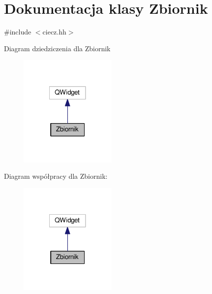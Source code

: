 \hypertarget{class_zbiornik}{\section{Dokumentacja klasy Zbiornik}
\label{class_zbiornik}
}


{\ttfamily \#include $<$ciecz.\-hh$>$}



Diagram dziedziczenia dla Zbiornik
\nopagebreak
\begin{figure}[H]
\begin{center}
\leavevmode
\includegraphics[width=134pt]{class_zbiornik__inherit__graph}
\end{center}
\end{figure}


Diagram współpracy dla Zbiornik\-:
\nopagebreak
\begin{figure}[H]
\begin{center}
\leavevmode
\includegraphics[width=134pt]{class_zbiornik__coll__graph}
\end{center}
\end{figure}
